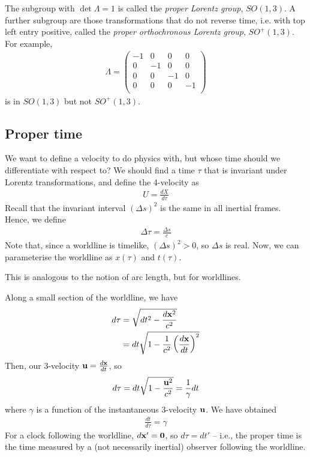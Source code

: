 \documentclass{../../template/note}
\begin{document}
    The subgroup with \(\det \Lambda = 1\) is called the \emph{proper Lorentz group}, \(SO(1, 3)\). A further subgroup are those transformations that do not reverse time, i.e. with top left entry positive, called the \emph{proper orthochronous Lorentz group}, \(SO^+(1, 3)\). For example,
    \begin{align*}
        \Lambda = \begin{pmatrix}
         -1 & 0 & 0 & 0 \\
         0 & -1 & 0 & 0 \\
         0 & 0 & -1 & 0 \\
         0 & 0 & 0 & -1 \\
        \end{pmatrix}
    \end{align*}
    is in \(SO(1, 3)\) but not \(SO^+(1, 3)\).
    
    \subsection{Proper time}

    We want to define a velocity to do physics with, but whose time should we differentiate with respect to? We should find a time \(\tau\) that is invariant under Lorentz transformations, and define the 4-velocity as
    \begin{align*}
        U = \frac{dX}{d\tau}
    \end{align*}
    Recall that the invariant interval \((\Delta s)^2\) is the same in all inertial frames. Hence, we define
    \begin{align*}
        \Delta \tau = \frac{\Delta s}{c}
    \end{align*}
    Note that, since a worldline is timelike, \((\Delta s)^2 > 0\), so \(\Delta s\) is real. Now, we can parameterise the worldline as \(x(\tau)\) and \(t(\tau)\).

    \begin{remark*}
        This is analogous to the notion of arc length, but for worldlines.
    \end{remark*}
    Along a small section of the worldline, we have
    \begin{align*}
        d\tau &= \sqrt{dt^2 - \frac{d\V x^2}{c^2}} \\
        &= dt \sqrt{1-\frac{1}{c^2} \left(\frac{d\V x}{dt}\right)^2}
    \end{align*}
    Then, our 3-velocity \(\V u = \frac{d\V x}{dt}\), so
    \begin{align*}
        d\tau = dt\sqrt{1-\frac{\V u^2}{c^2}} = \frac 1 \gamma dt
    \end{align*}
    where \(\gamma\) is a function of the instantaneous 3-velocity \(\V u\). We have obtained
    \begin{align*}
        \frac{dt}{d\tau} = \gamma
    \end{align*}
    For a clock following the worldline, \(d \V x' = \V 0\), so \(d\tau = dt'\) -- i.e., the proper time is the time measured by a (not necessarily inertial) observer following the worldline.
    
\end{document}
